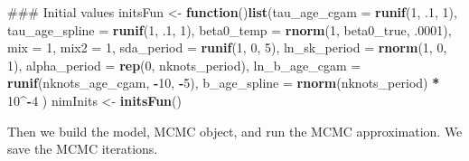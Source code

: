 \documentclass[11pt,]{article}
\newenvironment{Shaded}{\begin{snugshade}}{\end{snugshade}}
\newcommand{\KeywordTok}[1]{\textcolor[rgb]{0.13,0.29,0.53}{\textbf{#1}}}
\newcommand{\DataTypeTok}[1]{\textcolor[rgb]{0.13,0.29,0.53}{#1}}
\newcommand{\DecValTok}[1]{\textcolor[rgb]{0.00,0.00,0.81}{#1}}
\newcommand{\StringTok}[1]{\textcolor[rgb]{0.31,0.60,0.02}{#1}}
\newcommand{\ControlFlowTok}[1]{\textcolor[rgb]{0.13,0.29,0.53}{\textbf{#1}}}
\newcommand{\OperatorTok}[1]{\textcolor[rgb]{0.81,0.36,0.00}{\textbf{#1}}}
\newcommand{\NormalTok}[1]{#1}
\begin{document}
\begin{Shaded}
\begin{Highlighting}[]
\NormalTok{### Initial values}
\NormalTok{initsFun <-}\StringTok{ }\ControlFlowTok{function}\NormalTok{()}\KeywordTok{list}\NormalTok{(}\DataTypeTok{tau_age_cgam =} \KeywordTok{runif}\NormalTok{(}\DecValTok{1}\NormalTok{, .}\DecValTok{1}\NormalTok{, }\DecValTok{1}\NormalTok{),}
                          \DataTypeTok{tau_age_spline =} \KeywordTok{runif}\NormalTok{(}\DecValTok{1}\NormalTok{, .}\DecValTok{1}\NormalTok{, }\DecValTok{1}\NormalTok{),}
                          \DataTypeTok{beta0_temp =} \KeywordTok{rnorm}\NormalTok{(}\DecValTok{1}\NormalTok{, beta0_true, .}\DecValTok{0001}\NormalTok{),}
                          \DataTypeTok{mix =} \DecValTok{1}\NormalTok{,}
                          \DataTypeTok{mix2 =} \DecValTok{1}\NormalTok{,}
                          \DataTypeTok{sda_period =} \KeywordTok{runif}\NormalTok{(}\DecValTok{1}\NormalTok{, }\DecValTok{0}\NormalTok{, }\DecValTok{5}\NormalTok{),}
                          \DataTypeTok{ln_sk_period =} \KeywordTok{rnorm}\NormalTok{(}\DecValTok{1}\NormalTok{, }\DecValTok{0}\NormalTok{, }\DecValTok{1}\NormalTok{),}
                          \DataTypeTok{alpha_period =} \KeywordTok{rep}\NormalTok{(}\DecValTok{0}\NormalTok{, nknots_period),}
                          \DataTypeTok{ln_b_age_cgam =} \KeywordTok{runif}\NormalTok{(nknots_age_cgam, }\OperatorTok{-}\DecValTok{10}\NormalTok{, }\OperatorTok{-}\DecValTok{5}\NormalTok{),}
                          \DataTypeTok{b_age_spline =} \KeywordTok{rnorm}\NormalTok{(nknots_period) }\OperatorTok{*}\StringTok{ }\DecValTok{10}\OperatorTok{^-}\DecValTok{4}
\NormalTok{                          )}
\NormalTok{nimInits <-}\StringTok{ }\KeywordTok{initsFun}\NormalTok{()}
\end{Highlighting}
\end{Shaded}

Then we build the model, MCMC object, and run the MCMC approximation. We
save the MCMC iterations.
\end{document}
